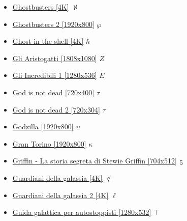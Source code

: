 		\begin{itemize}
			\item \href{https://mega.nz/#!7fhGAZAK!2bOefTV1QcNg-gG7XFyEpOmUkFCdlva9oRNCHk0nPso} {Ghostbusters [4K]} $\aleph$  \\ 
			\item \href{https://mega.nz/#!LSBy3DLI!wz81-5DzO3N1s8eIPj3DSXqLm1jHiJQkWcyZOqHwdak} {Ghostbusters 2 [1920x800]} $\wp$  \\ 
			\item \href{https://mega.nz/#!W2R3yQhT!JBuviIWzsPdBMjnZD2NkzHkU61DthsVcwEpXRSvN3vY} {Ghost in the shell [4K]} $\hbar$  \\ 
			\item \href{https://mega.nz/#!FQJWnYjb!p5dtHsa6ntjhxYswp49ZSWabh2UezWvHTYz4S9cjdO0} {Gli Aristogatti [1808x1080]} $Z$  \\ 
			\item \href{https://mega.nz/#!00omjL5D!plXYZ8ObzJNvPSmHYpTCleBA65iTxaE_M5NwPkj4UR4} {Gli Incredibili 1 [1280x536]} $E$  \\ 
			\item \href{https://mega.nz/#!R1AgFZja!bL50lcLe5GbzYGt3KunKQsuW-XnX4wv9SsnaBv9OaLo} {God is not dead [720x400]} $\tau$  \\ 
			\item \href{https://mega.nz/#F!B5QwmAKB!AWXXN1AtI8_6mKROoxfCKg} {God is not dead 2 [720x304]} $\tau$  \\ 
			\item \href{https://mega.nz/#!W48SmIKR!0s3XuT1Md6UY4mEFFszK8L17lHFD4P7Xj8FZxBJMYeE} {Godzilla [1920x800]} $\upsilon$  \\ 
			\item \href{https://mega.nz/#!TdJm3S6R!LoFHQkCbIk3jWCGEB623cnupwV-BjWDy5b5hkN1YUn4} {Gran Torino 	[1920x800]}  $\kappa$ \\ 
			\item \href{https://mega.nz/#!H2glAC6L!hc1EGz7izuQY3rwB9S8IW_xI8ilxOXP2fnObPkFFgnI} {Griffin - La storia segreta di Stewie Griffin [704x512]}  $\oldstylenums{5}$ \\ 
			\item \href{https://mega.nz/#!DzonzZAa!xBamLAzKQOljHUrFlQfRl8mUIQKsih95H5fwOdBiPCQ} {Guardiani della galassia [4K]}  $\notin$ \\ 
			\item \href{https://mega.nz/#!zChiXS7Z!pSXGbm_ggkB4gwsXir4xi9EPCPbdHda5II4_sI_zC-U} {Guardiani della galassia 2 [4K]}  $\ell$ \\ 
			\item \href{https://mega.nz/#!eWIAWZab!nnKUHHDfqQdG51XQrDGbFeEsninY1dO0JOo7S6_8m7k} {Guida galattica per autostoppisti [1280x532]}  $\top$ \\
		
		\end{itemize}
			
